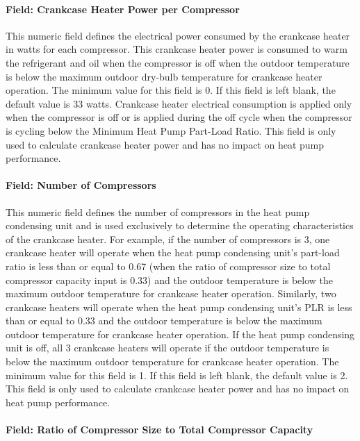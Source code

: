 \paragraph{Field: Crankcase Heater Power per Compressor}\label{field-crankcase-heater-power-per-compressor-1}

This numeric field defines the electrical power consumed by the crankcase heater in watts for each compressor. This crankcase heater power is consumed to warm the refrigerant and oil when the compressor is off when the outdoor temperature is below the maximum outdoor dry-bulb temperature for crankcase heater operation. The minimum value for this field is 0. If this field is left blank, the default value is 33 watts. Crankcase heater electrical consumption is applied only when the compressor is off or is applied during the off cycle when the compressor is cycling below the Minimum Heat Pump Part-Load Ratio. This field is only used to calculate crankcase heater power and has no impact on heat pump performance.

\paragraph{Field: Number of Compressors}\label{field-number-of-compressors-1}

This numeric field defines the number of compressors in the heat pump condensing unit and is used exclusively to determine the operating characteristics of the crankcase heater. For example, if the number of compressors is 3, one crankcase heater will operate when the heat pump condensing unit's part-load ratio is less than or equal to 0.67 (when the ratio of compressor size to total compressor capacity input is 0.33) and the outdoor temperature is below the maximum outdoor temperature for crankcase heater operation. Similarly, two crankcase heaters will operate when the heat pump condensing unit's PLR is less than or equal to 0.33 and the outdoor temperature is below the maximum outdoor temperature for crankcase heater operation. If the heat pump condensing unit is off, all 3 crankcase heaters will operate if the outdoor temperature is below the maximum outdoor temperature for crankcase heater operation. The minimum value for this field is 1. If this field is left blank, the default value is 2. This field is only used to calculate crankcase heater power and has no impact on heat pump performance.

\paragraph{Field: Ratio of Compressor Size to Total Compressor Capacity}\label{field-ratio-of-compressor-size-to-total-compressor-capacity-1}

